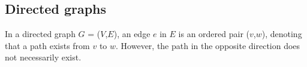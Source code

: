 \subsection{Directed graphs}

In a directed graph $G$ = ($V$,$E$), an edge $e$ in $E$ is an ordered pair ($v$,$w$), denoting that a path exists from $v$ to $w$. However, the path in the opposite direction does not necessarily exist.








